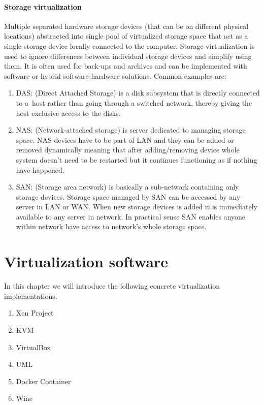 \subsubsection{Storage virtualization}
Multiple separated hardware storage devices (that can be on different physical locations) abstracted into single pool of virtualized storage space that act as a single storage device locally connected to the computer. Storage virtualization is used to ignore differences between individual storage devices and simplify using them. It is often used for back-ups and archives and can be implemented with software or hybrid software-hardware solutions. Common examples are:
\begin{enumerate}
\item DAS: (Direct Attached Storage) is a disk subsystem that is directly connected to a~host rather than going through a switched network, thereby giving the host exclusive access to the disks.
\item NAS: (Network-attached storage) is server dedicated to managing storage space. NAS devices have to be part of LAN and they can be added or removed dynamically meaning that after adding/removing device whole system doesn't need to be restarted but it continues functioning as if nothing have happened.
\item SAN: (Storage area network) is basically a sub-network containing only storage devices. Storage space managed by SAN can be accessed by any server in LAN or WAN. When new storage devices is added it is immediately available to any server in network. In practical sense SAN enables anyone within network have access to network's whole storage space.
\end{enumerate}


\chapter{Virtualization software} 
\label{chap_virt_software}
In this chapter we will introduce the following concrete virtualization implementations.
\begin{enumerate}
\item Xen Project
\item KVM
\item VirtualBox
\item UML
\item Docker Container
\item Wine
\end{enumerate}


